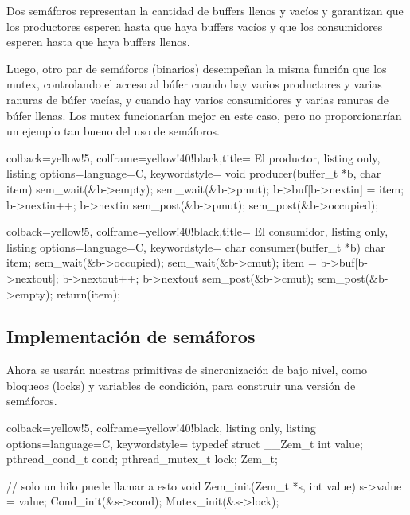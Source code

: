 \documentclass[openany]{book}
\begin{document}
Dos semáforos representan la cantidad de buffers llenos y vacíos y garantizan que los productores esperen hasta que haya buffers vacíos y que los consumidores esperen hasta que haya buffers llenos.

Luego, otro par de semáforos (binarios) desempeñan la misma función que los mutex, controlando el acceso al búfer cuando hay varios productores y varias ranuras de búfer vacías, y cuando hay varios consumidores y varias ranuras de búfer llenas. Los mutex funcionarían mejor en este caso, pero no proporcionarían un ejemplo tan bueno del uso de semáforos.

\begin{tcblisting}{colback=yellow!5, colframe=yellow!40!black,title= El productor, listing only, listing options={language=C, keywordstyle=\color{blue!35!white}\bfseries}}
void producer(buffer_t *b, char item) {
    sem_wait(&b->empty);
    sem_wait(&b->pmut);
    b->buf[b->nextin] = item;
    b->nextin++;
    b->nextin %
    sem_post(&b->pmut);
    sem_post(&b->occupied);
}
\end{tcblisting}

\begin{tcblisting}{colback=yellow!5, colframe=yellow!40!black,title= El consumidor, listing only, listing options={language=C, keywordstyle=\color{blue!35!white}\bfseries}}
char consumer(buffer_t *b) {
    char item;
    sem_wait(&b->occupied);
    sem_wait(&b->cmut);
    item = b->buf[b->nextout];
    b->nextout++;
    b->nextout %
    sem_post(&b->cmut);
    sem_post(&b->empty);
    return(item);
}
\end{tcblisting}

\subsection{Implementación de semáforos}

Ahora se usarán nuestras primitivas de sincronización de bajo nivel, como bloqueos (locks) y variables de condición, para construir una versión de semáforos.

\begin{tcblisting}{colback=yellow!5, colframe=yellow!40!black, listing only, listing options={language=C, keywordstyle=\color{blue!35!white}\bfseries}}
typedef struct __Zem_t {
    int value;
    pthread_cond_t cond;
    pthread_mutex_t lock;
} Zem_t;

// solo un hilo puede llamar a esto
void Zem_init(Zem_t *s, int value) {
    s->value = value;
    Cond_init(&s->cond);
    Mutex_init(&s->lock);
}
\end{tcblisting}  
\end{document}
